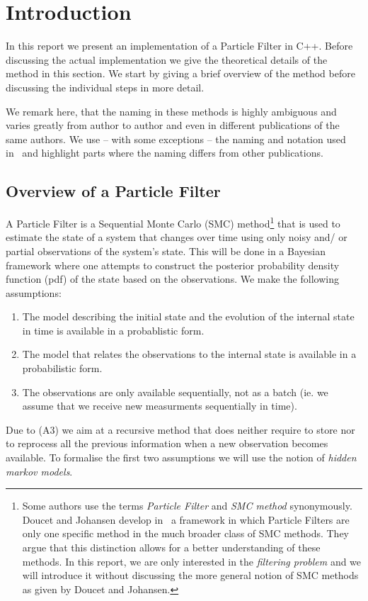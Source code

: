 \section*{Introduction}\label{sec:intro}
In this report we present an implementation of a Particle Filter in
C++. Before discussing the actual implementation we give the
theoretical details of the method in this section. We start by giving
a brief overview of the method before discussing the individual steps
in more detail.

We remark here, that the naming in these methods is highly ambiguous
and varies greatly from author to author and even in different
publications of the same authors. We use -- with some exceptions --
the naming and notation used in~\cite{doucet} and highlight parts
where the naming differs from other publications.

\subsection*{Overview of a Particle Filter}
A Particle Filter is a Sequential Monte Carlo (SMC)
method\footnote{Some authors use the terms \emph{Particle Filter} and
  \emph{SMC method} synonymously. Doucet and Johansen develop
  in~\cite{doucet} a framework in which Particle Filters are only one
  specific method in the much broader class of SMC methods. They argue
  that this distinction allows for a better understanding of these
  methods. In this report, we are only interested in the
  \emph{filtering problem} and we will introduce it without discussing
  the more general notion of SMC methods as given by Doucet and
  Johansen.} that is used to estimate the state of a system that
changes over time using only noisy and/ or partial observations of the
system's state. This will be done in a Bayesian framework where one
attempts to construct the posterior probability density function (pdf)
of the state based on the observations. We make the following
assumptions:
\begin{enumerate}[label=(A\arabic*)]
\item The model describing the initial state and the evolution of the
  internal state in time is available in a probablistic form.
\item The model that relates the observations to the internal state is
  available in a probabilistic form.
\item The observations are only available sequentially, not as a batch
  (ie. we assume that we receive new measurments sequentially in
  time).
\end{enumerate}
Due to (A3) we aim at a recursive method that does neither require to
store nor to reprocess all the previous information when a new
observation becomes available. To formalise the first two assumptions
we will use the notion of \emph{hidden markov models}.

